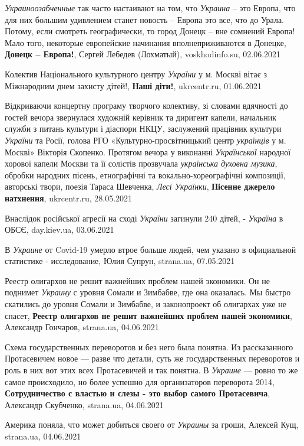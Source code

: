 \emph{Украиноозабченные} так часто настаивают на том, что \emph{Украина} – это
Европа, что для них большим удивлением станет новость – Европа это все, что до
Урала. Потому, если смотреть географически, то город Донецк – вне сомнений
Европа! Мало того, некоторые европейские начинания вполнеприживаются в Донецке,
\textbf{Донецк – Европа!}, Сергей Лебедев (Лохматый), voskhodinfo.su, 02.06.2021

Колектив Національного культурного центру \emph{України} у м. Москві вітає з Міжнародним днем захисту дітей!,
\textbf{Наші діти!}, ukrcentr.ru, 01.06.2021

Відкриваючи концертну програму творчого колективу, зі словами вдячності до
гостей вечора звернулася художній керівник та диригент капели, начальник служби
з питань культури і діаспори НКЦУ, заслужений працівник культури \emph{України} та
Росії, голова РГО «Культурно-просвітницький центр \emph{українців} у м. Москві»
Вікторія Скопенко.  Протягом вечора у виконанні \emph{Української} народної хорової
капели Москви та її солістів прозвучала \emph{українська духовна музика}, обробки
народних пісень, етнографічні та вокально-хореографічні композиції, авторські
твори, поезія Тараса Шевченка, \emph{Лесі Українки},
\textbf{Пісенне джерело натхнення}, ukrcentr.ru, 28.05.2021

Внаслідок російської агресії на сході \emph{України} загинули 240 дітей, -
\emph{Україна} в ОБСЄ, day.kiev.ua, 03.06.2021

В \emph{Украине} от Covid-19 умерло втрое больше людей, чем указано в официальной статистике - исследование,
Юлия Супрун, strana.ua, 07.05.2021

Реестр олигархов не решит важнейших проблем нашей экономики. Он не поднимет
\emph{Украину} с уровня Сомали и Зимбабве, где она оказалась. Мы быстро
скатились до уровня Сомали и Зимбабве, и законопроект об олигархах уже не
спасет,
\textbf{Реестр олигархов не решит важнейших проблем нашей экономики},
Александр Гончаров, strana.ua, 04.06.2021

Схема государственных переворотов и без него была понятна. Из рассказанного
Протасевичем новое — разве что детали, суть же государственных переворотов и
роль в них вот этих всех Протасевичей и так понятна. В \emph{Украине} — ровно то же
самое происходило, но более успешно для организаторов переворота 2014,
\textbf{Сотрудничество с властью и слезы - это выбор самого Протасевича},
Александр Скубченко, strana.ua, 04.06.2021

Америка поняла, что может добиться своего от \emph{Украины} за гроши,
Алексей Кущ, strana.ua, 04.06.2021

